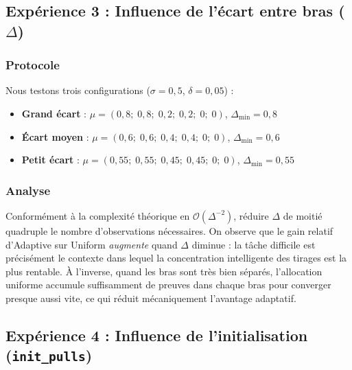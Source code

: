 \documentclass[11pt,a4paper]{article}
\begin{document}
\subsection{Expérience 3 : Influence de l'écart entre bras ($\Delta$)}

\subsubsection{Protocole}

Nous testons trois configurations ($\sigma = 0{,}5$, $\delta = 0{,}05$) :

\begin{itemize}
  \item \textbf{Grand écart} : $\mu = (0{,}8;\; 0{,}8;\; 0{,}2;\; 0{,}2;\; 0;\; 0)$,
        $\Delta_{\min} = 0{,}8$
  \item \textbf{Écart moyen} : $\mu = (0{,}6;\; 0{,}6;\; 0{,}4;\; 0{,}4;\; 0;\; 0)$,
        $\Delta_{\min} = 0{,}6$
  \item \textbf{Petit écart} : $\mu = (0{,}55;\; 0{,}55;\; 0{,}45;\; 0{,}45;\; 0;\; 0)$,
        $\Delta_{\min} = 0{,}55$
\end{itemize}

\subsubsection{Analyse}

Conformément à la complexité théorique en $\mathcal{O}(\Delta^{-2})$,
réduire $\Delta$ de moitié quadruple le nombre d'observations nécessaires.
On observe que le gain relatif d'Adaptive sur Uniform \emph{augmente}
quand $\Delta$ diminue : la tâche difficile est précisément le contexte
dans lequel la concentration intelligente des tirages est la plus rentable.
À l'inverse, quand les bras sont très bien séparés, l'allocation uniforme
accumule suffisamment de preuves dans chaque bras pour converger presque
aussi vite, ce qui réduit mécaniquement l'avantage adaptatif.

\subsection{Expérience 4 : Influence de l'initialisation (\texttt{init\_pulls})}
\end{document}
